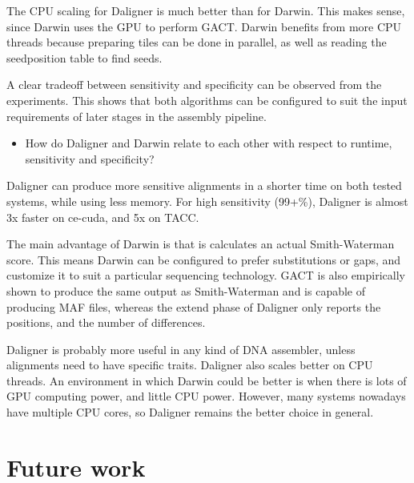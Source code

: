 \documentclass[../thesis.tex]{subfiles}
\begin{document}
The CPU scaling for Daligner is much better than for Darwin.
This makes sense, since Darwin uses the GPU to perform GACT.
Darwin benefits from more CPU threads because preparing tiles can be done in parallel, as well as reading the seedposition table to find seeds.

A clear tradeoff between sensitivity and specificity can be observed from the experiments.
This shows that both algorithms can be configured to suit the input requirements of later stages in the assembly pipeline.



\begin{itemize}
\item How do Daligner and Darwin relate to each other with respect to runtime, sensitivity and specificity?
\end{itemize}
Daligner can produce more sensitive alignments in a shorter time on both tested systems, while using less memory.
For high sensitivity (99+\%), Daligner is almost 3x faster on ce-cuda, and 5x on TACC.

The main advantage of Darwin is that is calculates an actual Smith-Waterman score.
This means Darwin can be configured to prefer substitutions or gaps, and customize it to suit a particular sequencing technology.
GACT is also empirically shown to produce the same output as Smith-Waterman and is capable of producing MAF files, whereas the extend phase of Daligner only reports the positions, and the number of differences.

Daligner is probably more useful in any kind of DNA assembler, unless alignments need to have specific traits.
Daligner also scales better on CPU threads.
An environment in which Darwin could be better is when there is lots of GPU computing power, and little CPU power.
However, many systems nowadays have multiple CPU cores, so Daligner remains the better choice in general.
\section{Future work}


\end{document}
